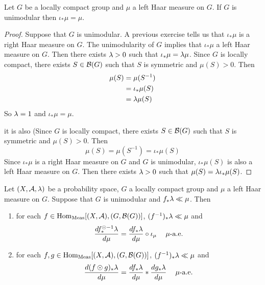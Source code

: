\documentclass{book}
\begin{document}
	\begin{ex}  
		Let $G$ be a locally compact group and $\mu$ a left Haar measure on $G$. If $G$ is unimodular then $\iota_*\mu = \mu$.
	\end{ex}

	\begin{proof}
		Suppose that $G$ is unimodular. A previous exercise tells us that $\iota_*\mu$ is a right Haar measure on $G$. The unimodularity of $G$ implies that $\iota_*\mu$ a left Haar measure on $G$. Then there exists $\lambda >0$ such that $\iota_*\mu = \lambda \mu$. Since $G$ is locally compact, there exists $S \in \mathcal{B}(G)$ such that $S$ is symmetric and $\mu(S) > 0$. Then 
		\begin{align*}
			\mu(S) 
			& = \mu(S^{-1}) \\
			& = \iota_*\mu(S) \\
			& = \lambda \mu(S) 
		\end{align*}	
		So $\lambda = 1$ and $\iota_*\mu = \mu$.

		it is also (Since $G$ is locally compact, there exists $S \in \mathcal{B}(G)$ such that $S$ is symmetric and $\mu(S) > 0$. Then 
		$$\mu(S) = \mu(S^{-1}) = \iota_*\mu(S)$$ Since $\iota_*\mu$ is a right Haar measure on $G$ and $G$ is unimodular, $\iota_*\mu(S)$ is also a left Haar measure on $G$. Then there exists $\lambda > 0$ such that $\mu(S) = \lambda\iota_*\mu(S)$.
	\end{proof}

	\begin{ex}
		Let $(X, \mathcal{A}, \lambda)$ be a probability space, $G$ a locally compact group and $\mu$ a left Haar measure on $G$. Suppose that $G$ is unimodular and $f_*\lambda \ll \mu$. Then 
		\begin{enumerate}
			\item for each $f \in \operatorname{Hom}_{\operatorname{\text{Meas}}}[(X, \mathcal{A}), (G, \mathcal{B}(G))]$, $(f^{-1})_*\lambda \ll \mu$ and 
			$$\frac{d f^{\odot -1}_*\lambda}{d \mu} = \frac{d f_*\lambda }{d\mu} \circ \iota_{\mu} \text{ \hspace{.2cm} $\mu$-a.e.}$$ 
			\item for each $f,g \in \operatorname{Hom}_{\operatorname{\text{Meas}}}[(X, \mathcal{A}), (G, \mathcal{B}(G))]$, $(f^{-1})_*\lambda \ll \mu$ and 
			$$\frac{d (f \odot g)_*\lambda}{d \mu} = \frac{d f_*\lambda }{d\mu} * \frac{d g_*\lambda }{d\mu} \text{ \hspace{.2cm} $\mu$-a.e.}$$ 
		\end{enumerate} 
	\end{ex}
\end{document}
